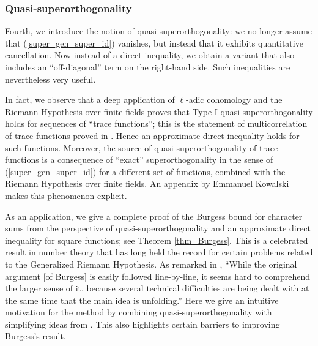 \documentclass[oneside,11pt]{amsart}
\begin{document}
\subsubsection*{Quasi-superorthogonality} Fourth, we introduce the notion of quasi-superorthogonality: we no longer assume that  (\ref{super_gen_super_id}) vanishes, but instead that it exhibits  quantitative cancellation. Now instead of a direct inequality, we obtain a variant that also includes an  ``off-diagonal'' term on the right-hand side. 
Such inequalities are nevertheless very useful. 

In fact, we observe that a deep application of $\ell$-adic cohomology  and the Riemann Hypothesis over finite fields proves that Type I quasi-superorthogonality holds for sequences of   ``trace functions''; this is the statement of  multicorrelation of trace functions proved in \cite{FKM15}.  Hence an approximate direct inequality holds for such functions. Moreover, the source of quasi-superorthogonality of trace functions is a consequence of ``exact'' superorthogonality in the sense of (\ref{super_gen_super_id}) for a different set of functions, combined with the Riemann Hypothesis over finite fields. An appendix by Emmanuel Kowalski makes this phenomenon explicit.  

As an application, we  give a complete proof of  the Burgess bound for character sums \cite{Bur57} from the perspective of  quasi-superorthogonality and an approximate direct inequality for square functions; see Theorem \ref{thm_Burgess}. This is a celebrated result in number theory that has long held the  record for certain problems related to the Generalized Riemann Hypothesis. 
As remarked in \cite{GalMon10}, ``While the original argument [of Burgess] is easily followed line-by-line, it seems hard to comprehend the larger
sense of it, because several technical difficulties are being dealt with at the same time that the main
idea is unfolding.''  Here we give an   intuitive motivation for the method by combining quasi-superorthogonality with simplifying ideas from \cite{GalMon10, HB12}. This also  highlights certain barriers to improving Burgess's result. 
\end{document}
